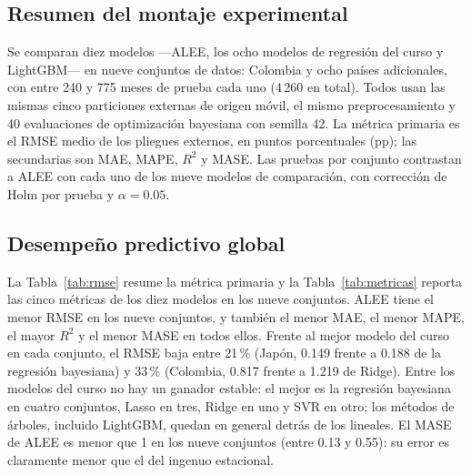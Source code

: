 \documentclass[11pt]{article}
\begin{document}
\FloatBarrier
\subsection{Resumen del montaje experimental}

Se comparan diez modelos ---ALEE, los ocho modelos de regresión del curso y LightGBM--- en nueve conjuntos de datos: Colombia y ocho países adicionales, con entre 240 y 775 meses de prueba cada uno (4\,260 en total). Todos usan las mismas cinco particiones externas de origen móvil, el mismo preprocesamiento y 40 evaluaciones de optimización bayesiana con semilla 42. La métrica primaria es el RMSE medio de los pliegues externos, en puntos porcentuales (pp); las secundarias son MAE, MAPE, $R^2$ y MASE. Las pruebas por conjunto contrastan a ALEE con cada uno de los nueve modelos de comparación, con corrección de Holm por prueba y $\alpha=0.05$.

\FloatBarrier
\subsection{Desempeño predictivo global}

La Tabla~\ref{tab:rmse} resume la métrica primaria y la Tabla~\ref{tab:metricas} reporta las cinco métricas de los diez modelos en los nueve conjuntos. ALEE tiene el menor RMSE en los nueve conjuntos, y también el menor MAE, el menor MAPE, el mayor $R^2$ y el menor MASE en todos ellos. Frente al mejor modelo del curso en cada conjunto, el RMSE baja entre 21\,\% (Japón, 0.149 frente a 0.188 de la regresión bayesiana) y 33\,\% (Colombia, 0.817 frente a 1.219 de Ridge). Entre los modelos del curso no hay un ganador estable: el mejor es la regresión bayesiana en cuatro conjuntos, Lasso en tres, Ridge en uno y SVR en otro; los métodos de árboles, incluido LightGBM, quedan en general detrás de los lineales. El MASE de ALEE es menor que 1 en los nueve conjuntos (entre 0.13 y 0.55): su error es claramente menor que el del ingenuo estacional.

\begin{table}[H]
\centering
\caption{RMSE medio de los cinco pliegues externos (pp). En negrita el mejor modelo de cada conjunto y subrayado el segundo. $^{\dagger}$: ALEE es significativamente mejor que ese modelo (Diebold-Mariano-HLN, $p$ ajustado por Holm $<0.05$). Las desviaciones estándar están en la Tabla~\ref{tab:metricas}.}
\label{tab:rmse}
\small
\resizebox{\textwidth}{!}{}
\end{table}
\end{document}
